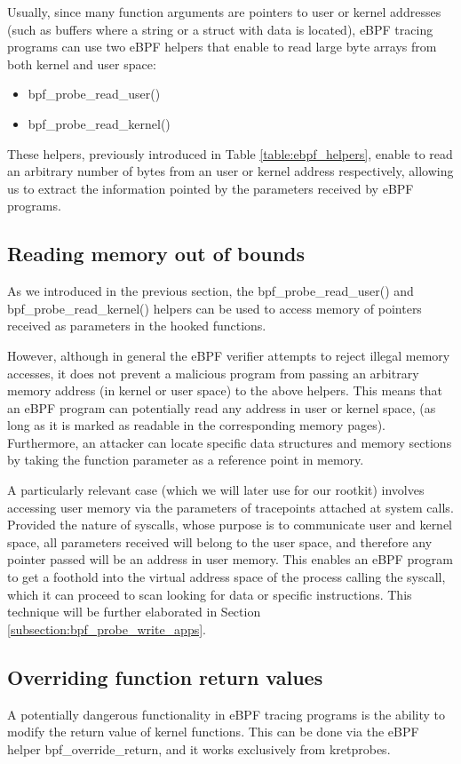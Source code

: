 Usually, since many function arguments are pointers to user or kernel addresses (such as buffers where a string or a struct with data is located), eBPF tracing programs can use two eBPF helpers that enable to read large byte arrays from both kernel and user space:
\begin{itemize}
\item bpf\_probe\_read\_user()
\item bpf\_probe\_read\_kernel()
\end{itemize}

These helpers, previously introduced in Table \ref{table:ebpf_helpers}, enable to read an arbitrary number of bytes from an user or kernel address respectively, allowing us to extract the information pointed by the parameters received by eBPF programs.

\subsection{Reading memory out of bounds} \label{subsection:out_read_bounds}
As we introduced in the previous section, the bpf\_probe\_read\_user() and bpf\_probe\_read\_kernel() helpers can be used to access memory of pointers received as parameters in the hooked functions. 

However, although in general the eBPF verifier attempts to reject illegal memory accesses, it does not prevent a malicious program from passing an arbitrary memory address (in kernel or user space) to the above helpers. This means that an eBPF program can potentially read any address in user or kernel space, (as long as it is marked as readable in the corresponding memory pages). Furthermore, an attacker can locate specific data structures and memory sections by taking the function parameter as a reference point in memory.

A particularly relevant case (which we will later use for our rootkit) involves accessing user memory via the parameters of tracepoints attached at system calls. Provided the nature of syscalls, whose purpose is to communicate user and kernel space, all parameters received will belong to the user space, and therefore any pointer passed will be an address in user memory. This enables an eBPF program to get a foothold into the virtual address space of the process calling the syscall, which it can proceed to scan looking for data or specific instructions. This technique will be further elaborated in Section \ref{subsection:bpf_probe_write_apps}.

\subsection{Overriding function return values}
A potentially dangerous functionality in eBPF tracing programs is the ability to modify the return value of kernel functions\cite{ebpf_friends_p15}\cite{ebpf_override_return}. This can be done via the eBPF helper bpf\_override\_return, and it works exclusively from kretprobes.

